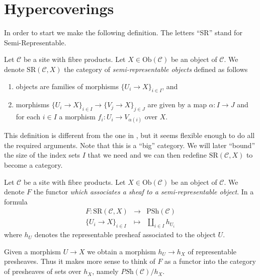 \section{Hypercoverings}
\label{section-hypercoverings}

\noindent
In order to start we make the following definition.
The letters ``SR'' stand for Semi-Representable.

\begin{definition}
\label{definition-SR}
Let $\mathcal{C}$ be a site with fibre products.
Let $X \in \text{Ob}(\mathcal{C})$ be an object of $\mathcal{C}$.
We denote $\text{SR}(\mathcal{C}, X)$ the category of
{\it semi-representable objects} defined as follows
\begin{enumerate}
\item objects are families of morphisms
$\{U_i \to X\}_{i \in I}$, and
\item morphisms $\{U_i \to X\}_{i \in I} \to
\{V_j \to X\}_{j \in J}$ are given by
a map $\alpha : I \to J$ and for each $i \in I$
a morphism $f_i : U_i \to V_{\alpha(i)}$ over $X$.
\end{enumerate}
\end{definition}

\noindent
This definition is different from the one in
\cite[Expose V, Sec. 7]{SGA4}, but it seems flexible
enough to do all the required arguments.
Note that this is a ``big'' category. We will later
``bound'' the size of the index sets $I$ that we need
and we can then redefine $\text{SR}(\mathcal{C}, X)$
to become a category.

\begin{definition}
\label{definition-SR-F}
Let $\mathcal{C}$ be a site with fibre products.
Let $X \in \text{Ob}(\mathcal{C})$ be an object of $\mathcal{C}$.
We denote $F$ the functor {\it which associates a sheaf to a
semi-representable object}. In a formula
\begin{eqnarray*}
F : \text{SR}(\mathcal{C}, X) & \longrightarrow & \text{PSh}(\mathcal{C}) \\
\{U_i \to X\}_{i \in I} & \longmapsto & \amalg_{i\in I} h_{U_i}
\end{eqnarray*}
where $h_U$ denotes the representable presheaf associated to
the object $U$.
\end{definition}

\noindent
Given a morphism $U \to X$ we obtain a morphism
$h_U \to h_X$ of representable presheaves.
Thus it makes more sense to think of $F$ as a functor
into the category of presheaves of sets over $h_X$,
namely $\textit{PSh}(\mathcal{C})/h_X$.

